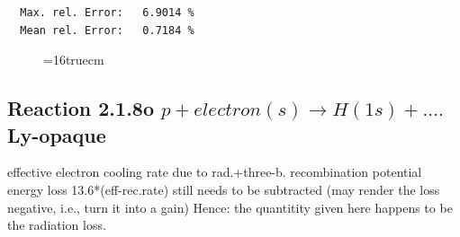 \documentclass[12pt,dvips]{article}
\begin{document}
\begin{small}
\begin{verbatim}
  Max. rel. Error:   6.9014 %
  Mean rel. Error:   0.7184 %

\end{verbatim}\end{small}
\begin{figure} \label{2.1.8r4}
\epsfxsize=16truecm
\end{figure}
\newpage

\subsection{
  Reaction 2.1.8o $p + electron(s) \rightarrow H(1s) + ....$ Ly-opaque
}

   effective electron cooling rate due to rad.+three-b. recombination
   potential energy loss 13.6*(eff-rec.rate) still needs to be
   subtracted (may render the loss negative, i.e., turn it into a gain)
   Hence: the quantitity given here happens to be the radiation loss.
\end{document}
